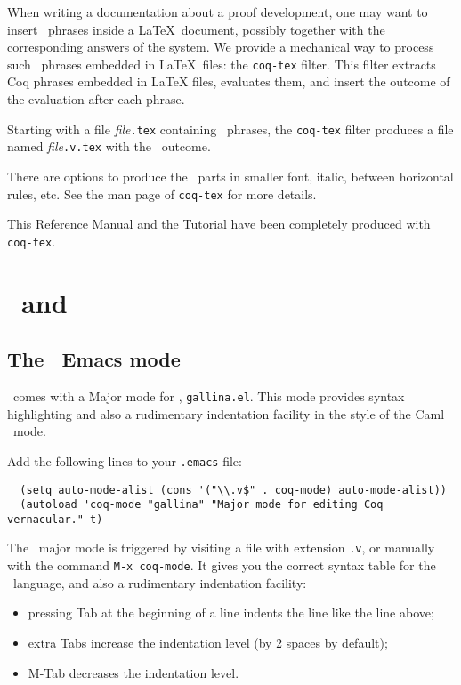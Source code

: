 When writing a documentation about a proof development, one may want
to insert \Coq\ phrases inside a \LaTeX\ document, possibly together with
the corresponding answers of the system. We provide a
mechanical way to process such \Coq\ phrases embedded in \LaTeX\ files: the
{\tt coq-tex} filter.  This filter extracts Coq phrases embedded in
LaTeX files, evaluates them, and insert the outcome of the evaluation
after each phrase.

Starting with a file {\em file}{\tt.tex} containing \Coq\ phrases,
the {\tt coq-tex} filter produces a file named {\em file}{\tt.v.tex} with
the \Coq\ outcome.

There are options to produce the \Coq\ parts in smaller font, italic,
between horizontal rules, etc.
See the man page of {\tt coq-tex} for more details.

\medskip{} This Reference Manual and the Tutorial
have been completely produced with {\tt coq-tex}.


\section[\Coq\ and \emacs]{\Coq\ and \emacs\label{Emacs}}

\subsection{The \Coq\ Emacs mode}

\Coq\ comes with a Major mode for \emacs, {\tt gallina.el}. This mode provides
syntax highlighting
and also a rudimentary indentation facility
in the style of the Caml \emacs\ mode.

Add the following lines to your \verb!.emacs! file:

\begin{verbatim}
  (setq auto-mode-alist (cons '("\\.v$" . coq-mode) auto-mode-alist))
  (autoload 'coq-mode "gallina" "Major mode for editing Coq vernacular." t)
\end{verbatim}

The \Coq\ major mode is triggered by visiting a file with extension {\tt .v},
or manually with the command \verb!M-x coq-mode!.
It gives you the correct syntax table for
the \Coq\ language, and also a rudimentary indentation facility:
\begin{itemize}
  \item pressing {\sc Tab} at the beginning of a line indents the line like
    the line above;

  \item extra {\sc Tab}s increase the indentation level
    (by 2 spaces by default);

  \item M-{\sc Tab} decreases the indentation level.
\end{itemize}

